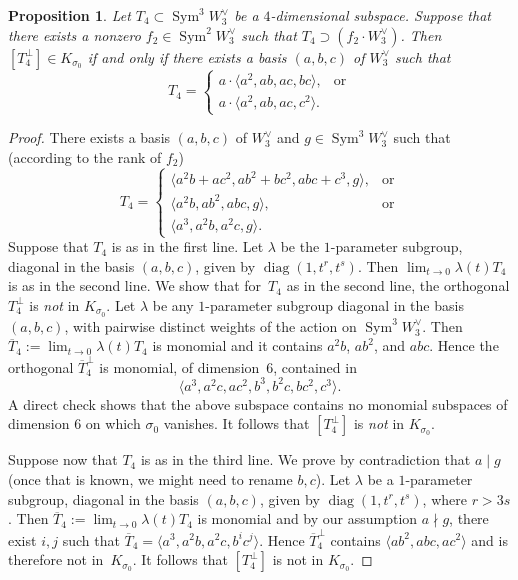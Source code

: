 \documentclass[11pt]{article}
\newtheorem{prop}[lemm]{Proposition}
\theoremstyle{definition}
\let\la\langle
\let\ra\rangle
\let\ov\overline
\DeclareMathOperator{\Sym}{Sym}
\DeclareMathOperator{\diag}{diag}
\begin{document}
\begin{prop}\label{gary}
Let $T_4\subset \Sym^3 \!W^{\vee}_3$ be a $4$-dimensional subspace. Suppose that there exists a nonzero $f_2\in\Sym^2\! W_3^{\vee}$ such that $T_4\supset (f_2\cdot W_3^{\vee})$. Then $[T_4^{\bot}]\in K_{\sigma_0}$ if and only if there exists a basis $(a,b,c)$ of $W^{\vee}_3$ such that
\begin{equation}
T_4=
\begin{cases}
a\cdot\la a^2, ab,ac,bc\ra,& \text{or}\\
a\cdot\la a^2,ab,ac,c^2\ra.
\end{cases}
\end{equation}
\end{prop}

\begin{proof}
There exists a basis $(a,b,c)$ of $W^{\vee}_3$ and $g\in\Sym^3 \!W^{\vee}_3$ such that (according to the rank of $f_2$)
\begin{equation}
T_4=
\begin{cases}
\la a^2b +ac^2,ab^2+bc^2,abc+c^3,g\ra,& \text{or}\\
\la a^2b,ab^2,abc,g\ra,& \text{or}\\
\la a^3,a^2b,a^2c,g\ra.
\end{cases}
\end{equation}
Suppose that $T_4$ is as in the first line. Let $\lambda$ be the $1$-parameter subgroup, diagonal in the basis $(a,b,c)$, given by $\diag(1,t^r,t^s)$. Then
$\lim_{t\to 0}\lambda(t)T_4$ is as in the second line. We show that for~$T_4$ as in the second line, the orthogonal $T_4^{\bot}$ is \emph{not} in $K_{\sigma_0}$. Let $\lambda$ be any $1$-parameter subgroup
diagonal in the basis $(a,b,c)$, with pairwise distinct weights of the action on $\Sym^3 \!W^{\vee}_3$. Then $\ov{T}_4:=\lim_{t\to 0}\lambda(t)T_4$ is monomial and it contains $a^2b$, $ab^2$, and $abc$. Hence the orthogonal $ \ov{T}_4 ^{\bot}$ is monomial, of dimension~$6$, contained in
\[
\la a^3,a^2c,ac^2,b^3,b^2c,bc^2,c^3\ra.
\]
A direct check shows that the above subspace contains no monomial subspaces of dimension $6$ on which $\sigma_0$ vanishes. It follows that $[T_4^{\bot}]$ is \emph{not} in $K_{\sigma_0}$.

Suppose now that $T_4$ is as in the third line. We prove by contradiction that $a\mid g$ (once that is known, we might need to rename $b,c$).
Let $\lambda$ be a $1$-parameter subgroup, diagonal in the basis $(a,b,c)$, given by $\diag(1,t^r,t^s)$, where $r>3s$.
Then \hbox{$\ov{T}_4:=\lim_{t\to 0}\lambda(t)T_4$} is monomial and by our assumption $a\nmid g$, there exist $i,j$ such that
$\ov{T}_4=\la a^3,a^2b,a^2c,b^i c^j\ra$. Hence $ \ov{T}_4 ^{\bot}$ contains $\la ab^2,abc,ac^2\ra$ and is therefore not in~$K_{\sigma_0}$. It follows that $[T_4^{\bot}]$ is not in $K_{\sigma_0}$.
\end{proof}
\end{document}
